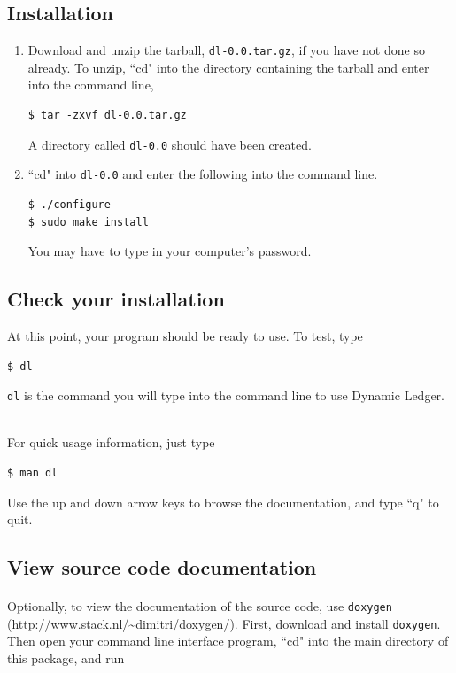 \documentclass{article}
\providecommand{\q}{$\quad$ \newline}
\begin{document}
\begin{flushleft}
\subsection{Installation}
\begin{enumerate}
\item Download and unzip the tarball, {\tt dl-0.0.tar.gz}, if you have not done so already. To unzip, ``cd" into the directory containing the tarball and enter into the command line,

\begin{lstlisting}
$ tar -zxvf dl-0.0.tar.gz
\end{lstlisting}

A directory called {\tt dl-0.0} should have been created.

\item ``cd" into {\tt dl-0.0} and enter the following into the command line.

\begin{lstlisting}
$ ./configure
$ sudo make install
\end{lstlisting}

You may have to type in your computer's password.
\end{enumerate}

\subsection{Check your installation}

At this point, your program should be ready to use. To test, type

\begin{lstlisting}
$ dl
\end{lstlisting}

{\tt dl} is the command you will type into the command line to use Dynamic Ledger. \q

For quick usage information, just type

\begin{lstlisting}
$ man dl
\end{lstlisting}

Use the up and down arrow keys to browse the documentation, and type ``q" to quit. 

\subsection{View source code documentation}

\paragraph{} Optionally, to view the documentation of the source code, use {\tt doxygen} (\url{http://www.stack.nl/~dimitri/doxygen/}). First, download and install {\tt doxygen}. Then open your command line interface program, ``cd" into the main directory of this package, and run


\end{flushleft}
\end{document}
